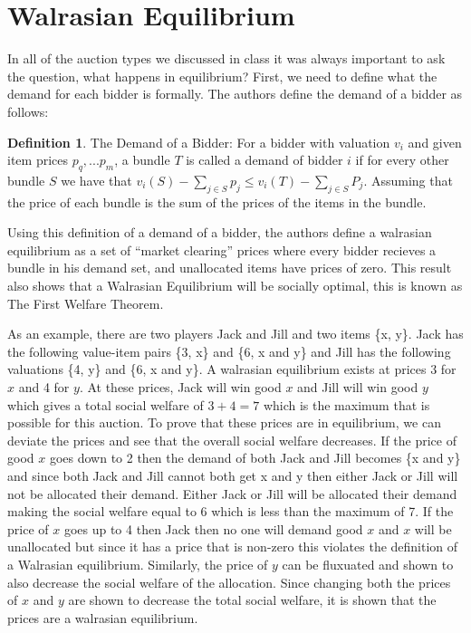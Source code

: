 \documentclass[10pt,onecolumn,letterpaper]{article}
\theoremstyle{definition}
\newtheorem{definition}{Definition}[section]
\begin{document}
\section{Walrasian Equilibrium} %

In all of the auction types we discussed in class it was always important to ask the question, what happens in equilibrium? First, we need to define what the demand for each bidder is formally. The authors define the demand of a bidder as follows:

\theoremstyle{definition}
\begin{definition}{The Demand of a Bidder:} For a bidder with valuation $v_i$ and given item prices $p_q,...p_m$, a bundle $T$ is called a demand of bidder $i$ if for every other bundle $S$ we have that $v_i(S) - \sum_{j \in S} p_j \leq v_i(T) - \sum_{j \in S} P_j$. Assuming that the price of each bundle is the sum of the prices of the items in the bundle.
\end{definition}

Using this definition of a demand of a bidder, the authors define a walrasian equilibrium as a set of ``market clearing'' prices where every bidder recieves a bundle in his demand set, and unallocated items have prices of zero. This result also shows that a Walrasian Equilibrium will be socially optimal, this is known as The First Welfare Theorem. 

As an example, there are two players Jack and Jill and two items \{x, y\}. Jack has the following value-item pairs \{3, x\} and \{6, x and y\} and Jill has the following valuations \{4, y\} and \{6, x and y\}. A walrasian equilibrium exists at prices 3 for $x$ and 4 for $y$. At these prices, Jack will win good $x$ and Jill will win good $y$ which gives a total social welfare of $3 + 4 = 7$ which is the maximum that is possible for this auction. To prove that these prices are in equilibrium, we can deviate the prices and see that the overall social welfare decreases. If the price of good $x$ goes down to 2 then the demand of both Jack and Jill becomes \{x and y\} and since both Jack and Jill cannot both get x and y then either Jack or Jill will not be allocated their demand. Either Jack or Jill will be allocated their demand making the social welfare equal to 6 which is less than the maximum of 7. If the price of $x$ goes up to 4 then Jack then no one will demand good $x$ and $x$ will be unallocated but since it has a price that is non-zero this violates the definition of a Walrasian equilibrium. Similarly, the price of $y$ can be fluxuated and shown to also decrease the social welfare of the allocation. Since changing both the prices of $x$ and $y$ are shown to decrease the total social welfare, it is shown that the prices are a walrasian equilibrium.
\end{document}
